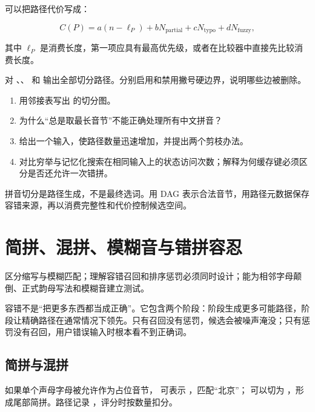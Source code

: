 可以把路径代价写成：

\[
C(P)=a(n-\ell_P)+bN_{\mathrm{partial}}+cN_{\mathrm{typo}}+dN_{\mathrm{fuzzy}},
\]

其中 \(\ell_P\) 是消费长度，第一项应具有最高优先级，或者在比较器中直接先比较消费长度。

\begin{lab}[枚举歧义]
对 、、 和  输出全部切分路径。分别启用和禁用撇号硬边界，说明哪些边被删除。
\end{lab}

\exercises
\begin{enumerate}
  \item 用邻接表写出  的切分图。
  \item 为什么“总是取最长音节”不能正确处理所有中文拼音？
  \item 给出一个输入，使路径数量迅速增加，并提出两个剪枝办法。
  \item 对比穷举与记忆化搜索在相同输入上的状态访问次数；解释为何缓存键必须区分是否还允许一次错拼。
\end{enumerate}

\begin{summarybox}
拼音切分是路径生成，不是最终选词。用 DAG 表示合法音节，用路径元数据保存容错来源，再以消费完整性和代价控制候选空间。
\end{summarybox}


\chapter{简拼、混拼、模糊音与错拼容忍}

\begin{goals}
区分缩写与模糊匹配；理解容错召回和排序惩罚必须同时设计；能为相邻字母颠倒、正式韵母写法和模糊音建立测试。
\end{goals}

容错不是“把更多东西都当成正确”。它包含两个阶段：阶段生成更多可能路径，阶段让精确路径在通常情况下领先。只有召回没有惩罚，候选会被噪声淹没；只有惩罚没有召回，用户错误输入时根本看不到正确词。

\section{简拼与混拼}

如果单个声母字母被允许作为占位音节， 可表示 ，匹配“北京”； 可以切为 ，形成尾部简拼。路径记录 ，评分时按数量扣分。


